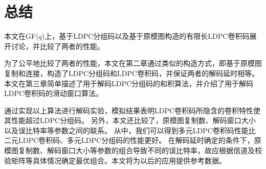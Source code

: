 \chapter{总结}
本文在GF($q$)上，基于LDPC分组码以及基于原模图构造的有限长LDPC卷积码展开讨论，并比较了两者的性能。

为了公平地比较了两者的性能，本文在第二章通过类似的构造方式，即基于原模图复制和连接，构造了LDPC分组码和LDPC卷积码，并保证两者的解码延时相等。
本文在第三章简单描述了用于解码LDPC分组码的和积算法，并介绍了用于解码LDPC卷积码的滑动窗口算法。

通过实现以上算法进行解码实验，模拟结果表明LDPC卷积码所隐含的卷积特性使其性能超过LDPC分组码。
另外，本文还比较了，原模图复制数、解码窗口大小以及误比特率等参数之间的联系。
从中，我们可以得到多元LDPC卷积码性能比二元LDPC卷积码、多元LDPC分组码的性能更好。
在解码延时确定的条件下，原模图复制数、解码窗口大小等参数的组合导致不同的误比特率，故应根据信道及校验矩阵等具体情况确定最优组合。本文将为以后的应用提供参考数据。